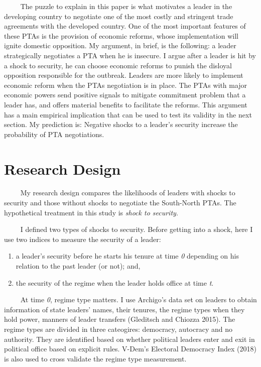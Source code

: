 \documentclass[12pt,]{article}
\begin{document}
\(\qquad\) The puzzle to explain in this paper is what motivates a
leader in the developing country to negotiate one of the most costly and
stringent trade agreements with the developed country. One of the most
important features of these PTAs is the provision of economic reforms,
whose implementation will ignite domestic opposition. My argument, in
brief, is the following: a leader strategically negotiates a PTA when he
is insecure. I argue after a leader is hit by a shock to security, he
can choose economic reforms to punish the disloyal opposition
responsible for the outbreak. Leaders are more likely to implement
economic reform when the PTAs negotiation is in place. The PTAs with
major economic powers send positive signals to mitigate commitment
problem that a leader has, and offers material benefits to facilitate
the reforms. This argument has a main empirical implication that can be
used to test its validity in the next section. My prediction is:
Negative shocks to a leader's security increase the probability of PTA
negotiations.

\section{Research Design}\label{research-design}

\(\qquad\) My research design compares the likelihoods of leaders with
shocks to security and those without shocks to negotiate the South-North
PTAs. The hypothetical treatment in this study is \emph{shock to
security}.

\(\qquad\) I defined two types of shocks to security. Before getting
into a shock, here I use two indices to measure the security of a
leader:

\begin{enumerate}
\def\labelenumi{\arabic{enumi})}
\item
  a leader's security before he starts his tenure at time \emph{0}
  depending on his relation to the past leader (or not); and,
\item
  the security of the regime when the leader holds office at time
  \emph{t}.
\end{enumerate}

\(\qquad\) At time \emph{0}, regime type matters. I use Archigo's data
set on leaders to obtain information of state leaders' names, their
tenures, the regime types when they hold power, manners of leader
transfers (Gleditsch and Chiozza 2015). The regime types are divided in
three cateogires: democracy, autocracy and no authority. They are
identified based on whether political leaders enter and exit in
political office based on explicit rules. V-Dem's Electoral Democracy
Index (2018) is also used to cross validate the regime type measurement.
\end{document}
